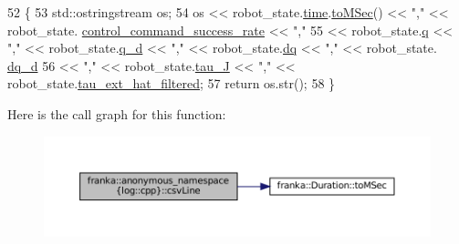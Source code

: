 \begin{DoxyCode}
52                                                        \{
53   std::ostringstream os;
54   os << robot\_state.\hyperlink{structfranka_1_1RobotState_aabfdabeaef8c1858c52dd32344bdd039}{time}.\hyperlink{classfranka_1_1Duration_a2a25ae33c8739b8f705f13798aa9e162}{toMSec}() << \textcolor{stringliteral}{","} << robot\_state.
      \hyperlink{structfranka_1_1RobotState_af208572613a6afcdc61a24970c71fa28}{control\_command\_success\_rate} << \textcolor{stringliteral}{","}
55      << robot\_state.\hyperlink{structfranka_1_1RobotState_ade3335d1ac2f6c44741a916d565f7091}{q} << \textcolor{stringliteral}{","} << robot\_state.\hyperlink{structfranka_1_1RobotState_a706045af1b176049e9e56df755325bd2}{q\_d} << \textcolor{stringliteral}{","} << robot\_state.\hyperlink{structfranka_1_1RobotState_af372a0081d72bc7b4fe873f99c7b2d8c}{dq} << \textcolor{stringliteral}{","} << robot\_state.
      \hyperlink{structfranka_1_1RobotState_aed294a088be27b927be9575a18bec949}{dq\_d}
56      << \textcolor{stringliteral}{","} << robot\_state.\hyperlink{structfranka_1_1RobotState_ad90e2518d661da0d8fa4c864bae210e5}{tau\_J} << \textcolor{stringliteral}{","} << robot\_state.\hyperlink{structfranka_1_1RobotState_acdef8005828d193e45b128085a9e363b}{tau\_ext\_hat\_filtered};
57   \textcolor{keywordflow}{return} os.str();
58 \}
\end{DoxyCode}
Here is the call graph for this function\+:
\nopagebreak
\begin{figure}[H]
\begin{center}
\leavevmode
\includegraphics[width=350pt]{namespacefranka_1_1anonymous__namespace_02log_8cpp_03_aa34d84f9fe38a21dfbe071c07a21dd6e_cgraph}
\end{center}
\end{figure}
\mbox{\label{namespacefranka_1_1anonymous__namespace_02log_8cpp_03_afc6faaf6d9388a97c26970a3f0fbf976}} 
